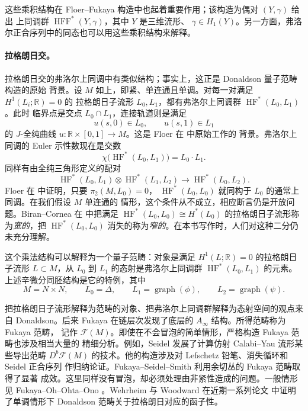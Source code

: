 \begin{remark}
这些乘积结构在 Floer--Fukaya 构造中也起着重要作用；该构造为偶对 $(Y,\gamma)$ 给出
上同调群 $\operatorname{HFF}^*(Y,\gamma)$，其中 $Y$ 是三维流形、
$\gamma\in H_1(Y)$。另一方面，弗洛尔正合序列中的同态也可以用这些乘积结构来解释。

\paragraph{拉格朗日交。}
拉格朗日交的弗洛尔上同调中有类似结构；事实上，这正是 Donaldson 量子范畴构造的原始
背景。设 $M$ 如上，即紧、单连通且单调。对每一对满足 $H^1(L_i;\mathbb R)=0$ 的
拉格朗日子流形 $L_0,L_1$，都有弗洛尔上同调群 $\operatorname{HF}^*(L_0,L_1)$。此时
临界点是交点 $L_0\cap L_1$，连接轨道则是满足
\[
  u(s,0)\in L_0,
  \qquad u(s,1)\in L_1
\]
的 $J$-全纯曲线 $u:\mathbb R\times[0,1]\to M$。这是 Floer 在  中原始工作的
背景。弗洛尔上同调的 Euler 示性数现在是交数
\[
  \chi\bigl(\operatorname{HF}^*(L_0,L_1)\bigr)=L_0\cdot L_1.
\]
同样有由全纯三角形定义的配对
\[
  \operatorname{HF}^*(L_0,L_1)\otimes\operatorname{HF}^*(L_1,L_2)
  \longrightarrow\operatorname{HF}^*(L_0,L_2).
\]
Floer 在  中证明，只要 $\pi_2(M,L_0)=0$，
$\operatorname{HF}^*(L_0,L_0)$ 就同构于 $L_0$ 的通常上同调。在我们假设 $M$ 单连通的
情形，这个条件从不成立，相应断言仍是开放问题。Biran--Cornea 在  中把满足
$\operatorname{HF}^*(L_0,L_0)\cong H^*(L_0)$ 的拉格朗日子流形称为\emph{宽的}，把
$\operatorname{HF}^*(L_0,L_0)$ 消失的称为\emph{窄的}。在本书写作时，人们对这种二分仍
未充分理解。

这个乘法结构可以解释为一个量子范畴：对象是满足 $H^1(L;\mathbb R)=0$ 的拉格朗日
子流形 $L\subset M$，从 $L_0$ 到 $L_1$ 的态射是弗洛尔上同调群
$\operatorname{HF}^*(L_0,L_1)$ 的元素。上述辛微分同胚结构是它的特例，其中
\[
  M=N\times N,
  \qquad L_0=\Delta,
  \qquad L_1=\operatorname{graph}(\phi),
  \qquad L_2=\operatorname{graph}(\psi).
\]

把拉格朗日子流形解释为范畴的对象、把弗洛尔上同调群解释为态射空间的观点来自
Donaldson。后来 Fukaya 在链层次发现了底层的 $A_\infty$ 结构。所得范畴称为 Fukaya 范畴，
记作 $\mathcal F(M)$。即使在不会冒泡的简单情形，严格构造 Fukaya 范畴也涉及相当大量的
精细分析。例如，Seidel  发展了计算仿射 Calabi--Yau 流形某些导出范畴
$D^b\mathcal F(M)$ 的技术。他的构造涉及对 Lefschetz 铅笔、消失循环和 Seidel 正合序列
作归纳论证。Fukaya--Seidel--Smith  利用余切丛的 Fukaya 范畴取得了显著
成效。这里同样没有冒泡，却必须处理由非紧性造成的问题。一般情形见
Fukaya--Oh--Ohta--Ono 。Wehrheim 与 Woodward 在近期一系列论文
 中证明了单调情形下 Donaldson 范畴关于拉格朗日对应的函子性。


\end{remark}
